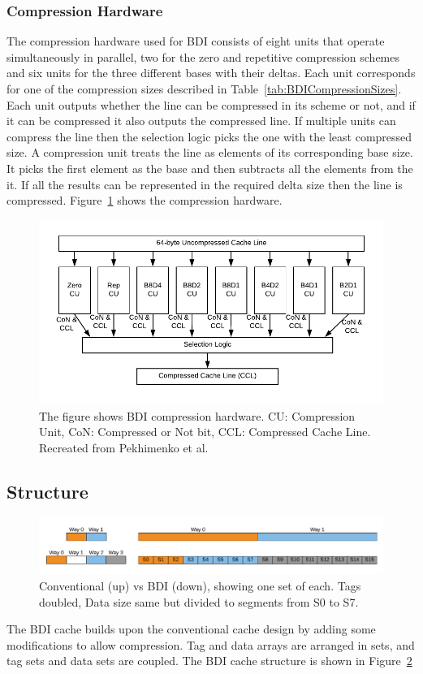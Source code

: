\subsubsection{Compression Hardware}
\label{sssec:BDICompressionHardware}
The compression hardware used for BDI consists of eight units that operate simultaneously in parallel, two for the zero and repetitive compression schemes and six units for the three different bases with their deltas. Each unit corresponds for one of the compression sizes described in Table~\ref{tab:BDICompressionSizes}. Each unit outputs whether the line can be compressed in its scheme or not, and if it can be compressed it also outputs the compressed line. If multiple units can compress the line then the selection logic picks the one with the least compressed size.
A compression unit treats the line as elements of its corresponding base size. It picks the first element as the base and then subtracts all the elements from the it. If all the results can be represented in the required delta size then the line is compressed. Figure~\ref{fig:BDIHardware} shows the compression hardware.
\begin{figure}
    \includegraphics[width=\textwidth]{BDIHardware.pdf}
    \caption[BDI Compression Hardware]{The figure shows BDI compression hardware. CU: Compression Unit, CoN: Compressed or Not bit, CCL: Compressed Cache Line. Recreated from Pekhimenko et al.\protect\cite{bdi}}
    \label{fig:BDIHardware}
\end{figure}

\subsection{Structure}
\label{ssec:BDIStructure}
\begin{figure}
    \includegraphics[width=\textwidth]{BDI.pdf}
    \caption[BDI Cache]{Conventional (up) vs BDI (down), showing one set of each. Tags doubled, Data size same but divided to segments from S0 to S7.}
    \label{fig:BDI}
\end{figure}
The BDI cache builds upon the conventional cache design by adding some modifications to allow compression. Tag and data arrays are arranged in sets, and tag sets and data sets are coupled. The BDI cache structure is shown in Figure~\ref{fig:BDI}
